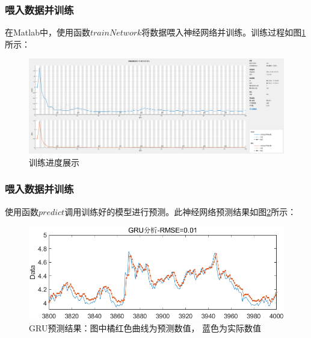\documentclass[aspectratio=169, 10pt, utf8, mathserif]{beamer}
\begin{document}
\begin{frame}
	\frametitle{喂入数据并训练}
	在Matlab中，使用函数$ trainNetwork $将数据喂入神经网络并训练。训练过程如图\ref{fig:screenshot015}所示：
	
	\begin{figure}[H]
		\centering
		\includegraphics[width=1\linewidth]{pic/screenshot015}
		\caption{训练进度展示}
		\label{fig:screenshot015}
	\end{figure}
\end{frame}	
\begin{frame}
	\frametitle{喂入数据并训练}
	使用函数$ predict $调用训练好的模型进行预测。此神经网络预测结果如图\ref{fig:screenshot016}所示：
	
	\begin{figure}[H]
		\centering
		\includegraphics[width=1\linewidth]{pic/screenshot016}
		\caption{GRU预测结果：图中\textcolor[RGB]{217, 83, 25}{橘红色}曲线为预测数值， \textcolor[RGB]{97,167,212}{蓝色}为实际数值}
		\label{fig:screenshot016}
	\end{figure}
\end{frame}	
\end{document}
